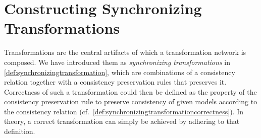 \chapter{Constructing Synchronizing Transformations
}
\label{chap:synchronization}



Transformations are the central artifacts of which a transformation network is composed.
We have introduced them as \emph{synchronizing transformations} in \autoref{def:synchronizingtransformation}, which are combinations of a consistency relation together with a consistency preservation rules that preserves it.
Correctness of such a transformation could then be defined as the property of the consistency preservation rule to preserve consistency of given models according to the consistency relation (cf.\ \autoref{def:synchronizingtransformationcorrectness}).
In theory, a correct transformation can simply be achieved by adhering to that definition.



